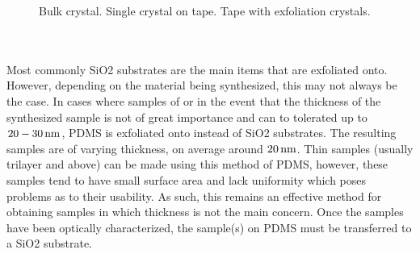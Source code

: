 \begin{figure}[ht]
	\centering
	\qquad
	\qquad
	\caption[Exfoliation steps]{\protect{} Bulk  crystal. \protect{} Single  crystal on tape. \protect{} Tape with exfoliation  crystals.}
	\label{fig:exfoliation_steps}
\end{figure}
\\ \\
\noindent Most commonly \acs{SiO2} substrates are the main items that are exfoliated onto. However, depending on the material being synthesized, this may not always be the case. In cases where samples of \hbn or in the event that the thickness of the synthesized sample is not of great importance and can to tolerated up to $20-30\,\mathrm{nm}$, \ac{PDMS} is exfoliated onto instead of \acs{SiO2} substrates. The resulting samples are of varying thickness, on average around $20\,\mathrm{nm}$. Thin samples (usually trilayer and above) can be made using this method of \acs{PDMS}, however, these samples tend to have small surface area and lack uniformity which poses problems as to their usability. As such, this remains an effective method for obtaining samples in which thickness is not the main concern. Once the samples have been optically characterized, the sample(s) on \acs{PDMS} must be transferred to a \acs{SiO2} substrate.

